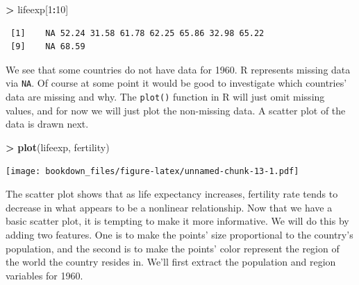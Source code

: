 \documentclass[]{krantz}
\makeatletter
\newenvironment{Shaded}{\begin{snugshade}}{\end{snugshade}}
\newcommand{\KeywordTok}[1]{\textcolor[rgb]{0.27,0.27,0.27}{\textbf{#1}}}
\newcommand{\DecValTok}[1]{\textcolor[rgb]{0.06,0.06,0.06}{#1}}
\newcommand{\StringTok}[1]{\textcolor[rgb]{0.5,0.5,0.5}{#1}}
\newcommand{\OperatorTok}[1]{\textcolor[rgb]{0.43,0.43,0.43}{\textbf{#1}}}
\newcommand{\NormalTok}[1]{#1}
\newenvironment{kframe}{%
\medskip{}
\setlength{\fboxsep}{.8em}
 \def\at@end@of@kframe{}%
 \ifinner\ifhmode%
  \def\at@end@of@kframe{\end{minipage}}%
  \begin{minipage}{\columnwidth}%
 \fi\fi%
 \def\FrameCommand##1{\hskip\@totalleftmargin \hskip-\fboxsep
 \colorbox{shadecolor}{##1}\hskip-\fboxsep
     \hskip-\linewidth \hskip-\@totalleftmargin \hskip\columnwidth}%
 \MakeFramed {\advance\hsize-\width
   \@totalleftmargin\z@ \linewidth\hsize
   \@setminipage}}%
 {\par\unskip\endMakeFramed%
 \at@end@of@kframe}
\renewenvironment{Shaded}{\begin{kframe}}{\end{kframe}}
\makeatother
\begin{document}
\begin{Shaded}
\begin{Highlighting}[]
\OperatorTok{>}\StringTok{ }\NormalTok{lifeexp[}\DecValTok{1}\OperatorTok{:}\DecValTok{10}\NormalTok{]}
\end{Highlighting}
\end{Shaded}

\begin{verbatim}
 [1]    NA 52.24 31.58 61.78 62.25 65.86 32.98 65.22
 [9]    NA 68.59
\end{verbatim}

We see that some countries do not have data for 1960. R represents
missing data via \texttt{NA}. Of course at some point it would be good
to investigate which countries' data are missing and why. The
\texttt{plot()} function in R will just omit missing values, and for now
we will just plot the non-missing data. A scatter plot of the data is
drawn next.

\begin{Shaded}
\begin{Highlighting}[]
\OperatorTok{>}\StringTok{ }\KeywordTok{plot}\NormalTok{(lifeexp, fertility)}
\end{Highlighting}
\end{Shaded}

\texttt{[image: bookdown\_files/figure-latex/unnamed-chunk-13-1.pdf]}

The scatter plot shows that as life expectancy increases, fertility rate
tends to decrease in what appears to be a nonlinear relationship. Now
that we have a basic scatter plot, it is tempting to make it more
informative. We will do this by adding two features. One is to make the
points' size proportional to the country's population, and the second is
to make the points' color represent the region of the world the country
resides in. We'll first extract the population and region variables for
1960.

\begin{Shaded}
\end{Shaded}
\end{document}
